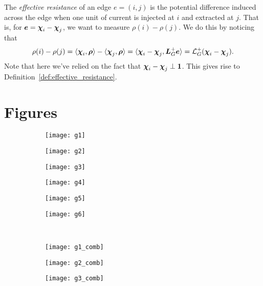 The \emph{effective resistance} of an edge $e=(i,j)$ is the potential difference induced across the edge when one unit of current is injected at $i$ and extracted at $j$. That is, for $\vb*{e}=\boldsymbol{\chi}_i-\boldsymbol{\chi}_j$, we want to measure $\rho(i)-\rho(j)$. We do this by noticing that 
\[\rho(i)-\rho(j) = \langle \boldsymbol{\chi}_i,\vb*{\rho}\rangle - \langle \boldsymbol{\chi}_j,\vb*{\rho}\rangle = \langle \boldsymbol{\chi}_i-\boldsymbol{\chi}_j,\vb*{L}_G^+\vb*{e}\rangle=\mathcal{L}_G^+(\boldsymbol{\chi}_i-\boldsymbol{\chi}_j).\]
Note that here we've relied on the fact that $\boldsymbol{\chi}_i-\boldsymbol{\chi}_j\perp \vb{1}$. This gives  rise to Definition~\ref{def:effective_resistance}. 




\chapter{Figures}
\label{sec:app_figures}

\begin{figure}[h]
	\centering 
	\begin{subfigure}[b]{0.16\textwidth}
		\centering
		\texttt{[image: g1]}
	\end{subfigure}
\begin{subfigure}[b]{0.16\textwidth}
	\texttt{[image: g2]}
\end{subfigure}
\begin{subfigure}[b]{0.16\textwidth}
	\texttt{[image: g3]}
\end{subfigure}
\begin{subfigure}[b]{0.16\textwidth}
	\texttt{[image: g4]}
\end{subfigure}
\begin{subfigure}[b]{0.16\textwidth}
	\texttt{[image: g5]}
\end{subfigure}
\begin{subfigure}[b]{0.16\textwidth}
	\texttt{[image: g6]}
\end{subfigure}\\
\vspace{0.3cm}
\begin{subfigure}[b]{0.16\textwidth}
	\centering
	\texttt{[image: g1\_comb]}
\end{subfigure}
\begin{subfigure}[b]{0.16\textwidth}
	\centering
	\texttt{[image: g2\_comb]}
\end{subfigure}
\begin{subfigure}[b]{0.16\textwidth}
	\centering
	\texttt{[image: g3\_comb]}
\end{subfigure}

\end{figure}
